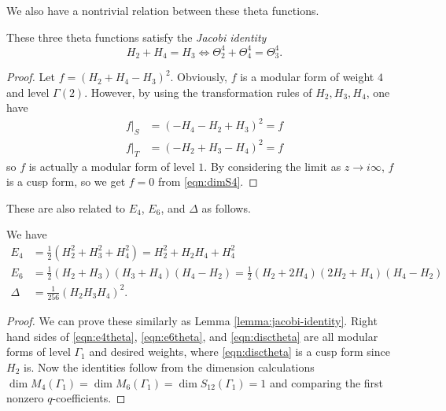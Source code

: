 We also have a nontrivial relation between these theta functions.
\begin{lemma}\label{lemma:jacobi-identity}
These three theta functions satisfy the \emph{Jacobi identity}
\begin{equation}\label{eqn:jacobi-identity}
H_{2} + H_{4} = H_{3} \Leftrightarrow \Theta_{2}^4 + \Theta_{4}^4 = \Theta_{3}^4.
\end{equation}
\end{lemma}
\begin{proof}
Let $f = (H_2 + H_4 - H_3)^{2}$.
Obviously, $f$ is a modular form of weight $4$ and level $\Gamma(2)$.
However, by using the transformation rules of $H_2, H_3, H_4$, one have
\begin{align}
    f|_{S} &= (-H_4 - H_2 + H_3)^{2} = f\\
    f|_{T} &= (-H_2 + H_3 - H_4)^{2} = f
\end{align}
so $f$ is actually a modular form of level $1$.
By considering the limit as $z \to i\infty$, $f$ is a cusp form, so we get $f = 0$ from \eqref{eqn:dimS4}.
\end{proof}

These are also related to $E_4$, $E_6$, and $\Delta$ as follows.
\begin{lemma}\label{lemma:lv1-lv2-identities}
We have
\begin{align}
    E_4 &= \frac{1}{2}(H_{2}^{2} + H_{3}^{2} + H_{4}^{2}) = H_{2}^{2} + H_{2}H_{4} + H_{4}^{2} \label{eqn:e4theta} \\
    E_6 &= \frac{1}{2} (H_{2} + H_{3})(H_{3} + H_{4}) (H_{4} - H_{2}) = \frac{1}{2}(H_2 + 2H_4)(2H_2 + H_4)(H_4 - H_2) \label{eqn:e6theta} \\
    \Delta &= \frac{1}{256} (H_{2}H_{3}H_{4})^2. \label{eqn:disctheta}
\end{align}
\end{lemma}
\begin{proof}
We can prove these similarly as Lemma \ref{lemma:jacobi-identity}.
Right hand sides of \eqref{eqn:e4theta}, \eqref{eqn:e6theta}, and \eqref{eqn:disctheta} are all modular forms of level $\Gamma_1$ and desired weights, where \eqref{eqn:disctheta} is a cusp form since $H_2$ is.
Now the identities follow from the dimension calculations $\dim M_4(\Gamma_1) = \dim M_6(\Gamma_1) = \dim S_{12}(\Gamma_1) = 1$ and comparing the first nonzero $q$-coefficients.
\end{proof}

